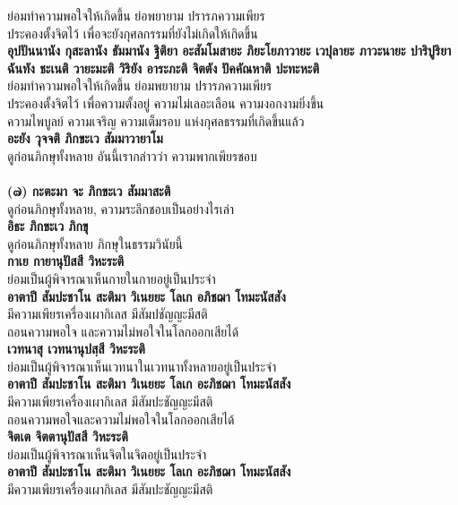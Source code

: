 \documentclass[12pt]{article}
\begin{document}
\indent ย่อมทำความพอใจให้เกิดขึ้น ย่อพยายาม ปรารภความเพียร \\
\indent ประคองตั้งจิตไว้ เพื่อจะยังกุศลกรรมที่ยังไม่เกิดให้เกิดขึ้น\\
\textbf{อุปปันนานัง กุสะลานัง ธัมมานัง ฐิติยา อะสัมโมสายะ 
ภิยะโยภาวายะ เวปุลายะ ภาวะนายะ ปาริปูริยา 
ฉันทัง ชะเนติ วายะมะติ วิริยัง อาระภะติ จิตตัง ปัคคัณหาติ ปะทะหะติ }\\
\indent ย่อมทำความพอใจให้เกิดขึ้น ย่อมพยายาม ปรารภความเพียร \\
\indent ประคองตั้งจิตไว้ เพื่อความตั้งอยู่ ความไม่เลอะเลือน ความงอกงามยิ่งขึ้น \\
\indent ความไพบูลย์ ความเจริญ ความเต็มรอบ แห่งกุศลธรรมที่เกิดขึ้นแล้ว\\
\textbf{อะยัง วุจจติ ภิกขะเว สัมมาวายาโม}\\
\indent ดูก่อนภิกษุทั้งหลาย อันนี้เรากล่าวว่า ความพากเพียรชอบ\\
\\
\textbf{(๗) กะตะมา จะ ภิกขะเว สัมมาสะติ}\\
\indent ดูก่อนภิกษุทั้งหลาย, ความระลึกชอบเป็นอย่างไรเล่า\\
\textbf{อิธะ ภิกขะเว ภิกขุ}\\
\indent ดูก่อนภิกษุทั้งหลาย ภิกษุในธรรมวินัยนี้\\
\textbf{กาเย กายานุปัสสี วิหะระติ}\\
\indent ย่อมเป็นผู้พิจารณาเห็นกายในกายอยู่เป็นประจำ\\
\textbf{อาตาปี สัมปะชาโน สะติมา วิเนยยะ โลเก อภิชฌา โทมะนัสสัง}\\
\indent มีความเพียรเครื่องเผากิเลส มีสัมปชัญญะมีสติ \\
\indent ถอนความพอใจ และความไม่พอใจในโลกออกเสียได้\\
\textbf{เวทนาสุ เวทนานุปสฺสี วิหะระติ}\\
\indent ย่อมเป็นผู้พิจารณาเห็นเวทนาในเวทนาทั้งหลายอยู่เป็นประจำ\\
\textbf{อาตาปี สัมปะชาโน สะติมา วิเนยยะ โลเก อะภิชฌา โทมะนัสสัง}\\
\indent มีความเพียรเครื่องเผากิเลส มีสัมปะชัญญะมีสติ \\
\indent ถอนความพอใจและความไม่พอใจในโลกออกเสียได้\\
\textbf{จิตเต จิตตานุปัสสี วิหะระติ}\\
\indent ย่อมเป็นผู้พิจารณาเห็นจิตในจิตอยู่เป็นประจำ\\
\textbf{อาตาปี สัมปะชาโน สะติมา วิเนยยะ โลเก อะภิชฌา โทมะนัสสัง}\\
\indent มีความเพียรเครื่องเผากิเลส มีสัมปะชัญญะมีสติ \\
\end{document}
